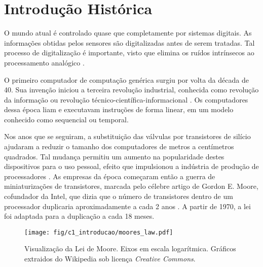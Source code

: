 \documentclass[11pt,a4paper,oneside]{book}
\begin{document}
	\frontmatter
	\tableofcontents
	\mainmatter
	
	\newcommand\qt[1]{\lq\lq{}#1\rq\rq{}}
	\newcommand\qti[1]{\lq\lq{}\textit{#1}\rq\rq{}}
\fi

\chapter{Introdu\c{c}\~ao Histórica}\label{CapIntro}


\vspace{0.8cm}
O mundo atual \'e controlado quase que completamente por sistemas digitais.
As informa\c{c}\~oes obtidas pelos sensores s\~ao digitalizadas antes de serem tratadas.
Tal processo de digitaliza\c{c}\~ao \'e importante, visto que elimina os ru\'idos intr\'insecos ao processamento anal\'ogico \cite{chen2004electrical}.

O primeiro computador de computa\c{c}\~ao gen\'erica surgiu por volta da d\'ecada de 40.
Sua inven\c{c}\~ao iniciou a terceira revolu\c{c}\~ao industrial, conhecida como revolu\c{c}\~ao da informa\c{c}\~ao ou revolu\c{c}\~ao t\'ecnico-cient\'ifica-informacional \cite{patterson2005coa}.
Os computadores dessa \'epoca liam e executavam instru\c{c}\~oes de forma linear, em um modelo conhecido como sequencial ou temporal. 

Nos anos que se seguiram, a substituição das válvulas por transistores de sil\'icio ajudaram a reduzir o tamanho dos computadores de metros a cent\'imetros quadrados.
Tal mudan\c{c}a permitiu um aumento na popularidade destes dispositivos para o uso pessoal, efeito que impulsionou a ind\'ustria de produ\c{c}\~ao de processadores \cite{Hennessy2011}.
As empresas da \'epoca come\c{c}aram ent\~ao a guerra de miniaturiza\c{c}\~oes de transistores, marcada pelo c\'elebre artigo de Gordon E. Moore, cofundador da Intel, que dizia que o n\'umero de transistores dentro de um processador duplicaria aproximadamente a cada 2 anos \cite{Moore1965}.
A partir de 1970, a lei foi adaptada para a duplica\c{c}\~ao a cada 18 meses.

\begin{figure}[h]
	\centering
	\texttt{[image: fig/c1\_introducao/moores\_law.pdf]}
	\caption{Visualização da Lei de Moore. Eixos em escala logarítmica. Gráficos extraidos do Wikipedia sob licença \textit{Creative Commons}.}
	\label{fig:moores_law}
\end{figure}
\end{document}
